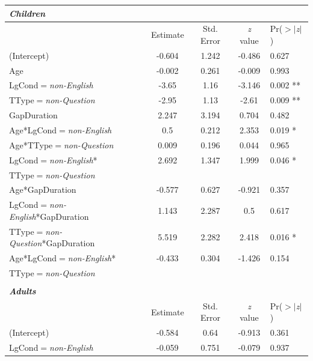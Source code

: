 \documentclass[authoryear, 12pt]{elsarticle}
\begin{document}
\linespread{1}
\begin{table}[h!]
\begin{small}
\begin{center}
  \begin{tabular}{lcccl}
  \textbf{\textit{Children}} &&&& \\
    \hline
			           &  Estimate & Std. Error & \textit{z} value & Pr($>$$|$\textit{z}$|$) \\    
    \hline
    (Intercept)   													& -0.604	& 1.242	& -0.486  & 0.627		\\
    Age             												& -0.002	& 0.261	& -0.009  & 0.993		\\
    LgCond$=$\textit{non-English} 						& -3.65		& 1.16	& -3.146  & 0.002 **	\\
    TType$=$\textit{non-Question}      					& -2.95		& 1.13	& -2.61	  & 0.009 **	\\
    GapDuration      											&  2.247	& 3.194	&  0.704  & 0.482		\\
    Age*LgCond$=$\textit{non-English} 					&  0.5		& 0.212	&  2.353  & 0.019 *	\\
    Age*TType$=$\textit{non-Question} 					&  0.009	& 0.196	&  0.044  & 0.965		\\
    LgCond$=$\textit{non-English}*						&  2.692	& 1.347	&  1.999  & 0.046 *	\\
    \hspace*{5mm} TType$=$\textit{non-Question} &&&& \\
    Age*GapDuration												& -0.577	& 0.627	& -0.921  & 0.357		\\
    LgCond$=$\textit{non-English}*GapDuration		&  1.143	& 2.287	&  0.5	  & 0.617		\\
    TType$=$\textit{non-Question}*GapDuration			&  5.519	& 2.282	&  2.418  & 0.016 *	\\
    Age*LgCond$=$\textit{non-English}*					& -0.433	& 0.304	& -1.426  & 0.154		\\
    \hspace*{5mm} TType$=$\textit{non-Question} &&&& \\
    \hline
  &&&& \\
  \textbf{\textit{Adults}} &&&& \\
    \hline
           &  Estimate & Std. Error & \textit{z} value & Pr($>$$|$\textit{z}$|$) \\    
    \hline
    (Intercept)														& -0.584   & 0.64  & -0.913 & 0.361			\\
    LgCond$=$\textit{non-English}							& -0.059   & 0.751 & -0.079 & 0.937			\\

\end{tabular}
\end{center}
\end{small}
\end{table}
\end{document}
